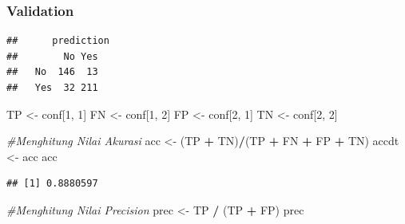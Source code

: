 \documentclass[]{article}
\newenvironment{Shaded}{\begin{snugshade}}{\end{snugshade}}
\newcommand{\CommentTok}[1]{\textcolor[rgb]{0.56,0.35,0.01}{\textit{#1}}}
\newcommand{\DecValTok}[1]{\textcolor[rgb]{0.00,0.00,0.81}{#1}}
\newcommand{\KeywordTok}[1]{\textcolor[rgb]{0.13,0.29,0.53}{\textbf{#1}}}
\newcommand{\NormalTok}[1]{#1}
\newcommand{\OperatorTok}[1]{\textcolor[rgb]{0.81,0.36,0.00}{\textbf{#1}}}
\newcommand{\StringTok}[1]{\textcolor[rgb]{0.31,0.60,0.02}{#1}}
\begin{document}
\hypertarget{validation}{%
\subsubsection{Validation}\label{validation}}

\begin{Shaded}
\end{Shaded}

\begin{verbatim}
##      prediction
##        No Yes
##   No  146  13
##   Yes  32 211
\end{verbatim}

\begin{Shaded}
\begin{Highlighting}[]
\NormalTok{TP <-}\StringTok{ }\NormalTok{conf[}\DecValTok{1}\NormalTok{, }\DecValTok{1}\NormalTok{] }
\NormalTok{FN <-}\StringTok{ }\NormalTok{conf[}\DecValTok{1}\NormalTok{, }\DecValTok{2}\NormalTok{] }
\NormalTok{FP <-}\StringTok{ }\NormalTok{conf[}\DecValTok{2}\NormalTok{, }\DecValTok{1}\NormalTok{] }
\NormalTok{TN <-}\StringTok{ }\NormalTok{conf[}\DecValTok{2}\NormalTok{, }\DecValTok{2}\NormalTok{] }
\end{Highlighting}
\end{Shaded}

\begin{Shaded}
\begin{Highlighting}[]
\CommentTok{#Menghitung Nilai Akurasi}
\NormalTok{acc <-}\StringTok{ }\NormalTok{(TP }\OperatorTok{+}\StringTok{ }\NormalTok{TN)}\OperatorTok{/}\NormalTok{(TP }\OperatorTok{+}\StringTok{ }\NormalTok{FN }\OperatorTok{+}\StringTok{ }\NormalTok{FP }\OperatorTok{+}\StringTok{ }\NormalTok{TN)}
\NormalTok{accdt <-}\StringTok{ }\NormalTok{acc}
\NormalTok{acc}
\end{Highlighting}
\end{Shaded}

\begin{verbatim}
## [1] 0.8880597
\end{verbatim}

\begin{Shaded}
\begin{Highlighting}[]
\CommentTok{#Menghitung Nilai Precision}
\NormalTok{prec <-}\StringTok{ }\NormalTok{TP }\OperatorTok{/}\StringTok{ }\NormalTok{(TP }\OperatorTok{+}\StringTok{ }\NormalTok{FP)}
\NormalTok{prec}
\end{Highlighting}
\end{Shaded}
\end{document}
